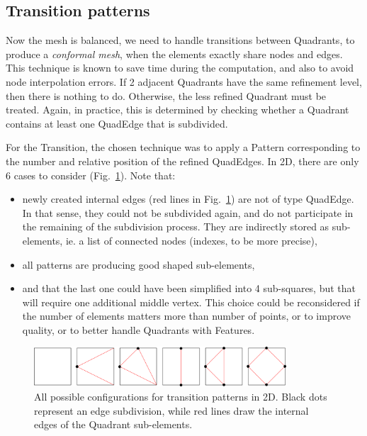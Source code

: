 \documentclass[10pt]{article}
\begin{document}
\subsection{Transition patterns}
%
Now the mesh is balanced, we need to handle transitions between Quadrants, to produce a \textit{conformal mesh}, when the elements exactly share nodes and edges. This technique is known to save time during the computation, and also to avoid node interpolation errors.
If 2 adjacent Quadrants have the same refinement level, then there is nothing to do. Otherwise, the less refined Quadrant must be treated. Again, in practice, this is determined by checking whether a Quadrant contains at least one QuadEdge that is subdivided.

For the Transition, the chosen technique was to apply a Pattern corresponding to the  number and relative position of the refined QuadEdges. In 2D, there are only 6 cases to consider (Fig.~\ref{fig:transitionpatterns}). Note that:
\begin{itemize}
\item newly created internal edges (red lines in Fig.~\ref{fig:transitionpatterns}) are not of type QuadEdge. In that sense, they could not be subdivided again, and do not participate in the remaining of the subdivision process. They are indirectly stored as sub-elements, ie. a list of connected nodes (indexes, to be more precise),
\item all patterns are producing good shaped sub-elements,
\item and that the last one could have been simplified into 4 sub-squares, but that will require one additional middle vertex. This choice could be reconsidered if the number of elements matters more than number of points, or to improve quality, or to better handle Quadrants with Features.
\end{itemize}
%
\begin{figure}[htb]
\centering
  \includegraphics[width=0.84\textwidth]{transitionPatterns.png}
 \caption{All possible configurations for transition patterns in 2D. Black dots represent an edge subdivision, while red lines draw the internal edges of the Quadrant sub-elements.}
\label{fig:transitionpatterns}
\end{figure}
%
\end{document}
